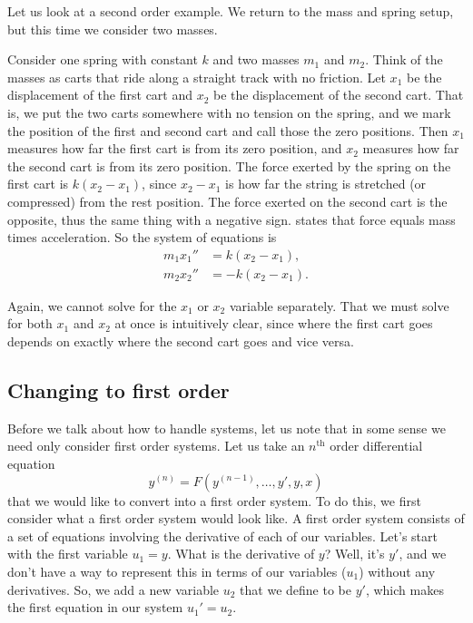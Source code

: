 \documentclass{ximera}
\begin{document}
\begin{example} \label{sintro:carts-example}
    Let us look at a second order example. We return to the mass and spring setup, but this time we consider two masses.
    
    \begin{mywrapfigsimp}{2.0in}{2.3in}
        \noindent
        
    \end{mywrapfigsimp}
    Consider one spring with constant $k$ and two masses $m_1$ and $m_2$.  Think of the masses as carts that ride along a straight track with no friction.  Let $x_1$ be the displacement of the first cart and $x_2$ be the displacement of the second cart. That is, we put the two carts somewhere with no tension on the spring, and we mark the position of the first and second cart and call those the zero positions. Then $x_1$ measures how far the first cart is from its zero position, and $x_2$ measures how far the second cart is from its zero position. The force exerted by the spring on the first cart is $k(x_2-x_1)$, since $x_2-x_1$ is how far the string is stretched (or compressed) from the rest position.  The force exerted on the second cart is the opposite, thus the same thing with a negative sign.  states that force equals mass times acceleration.  So the system of equations is
    \begin{align*}
        m_1 x_1'' & = k(x_2-x_1) , \\
        m_2 x_2'' & = - k(x_2-x_1) .
    \end{align*}
    
    Again, we cannot solve for the $x_1$ or $x_2$ variable separately. That we must solve for both $x_1$ and $x_2$ at once is intuitively clear, since where the first cart goes depends on exactly where the second cart goes and vice versa.
\end{example}

\subsection{Changing to first order}

Before we talk about how to handle systems, let us note that in some sense we need only consider first order systems. Let us take an $n^{\text{th}}$ order differential equation
\begin{equation*}
    y^{(n)} = F(y^{(n-1)},\ldots,y',y,x)
\end{equation*}
that we would like to convert into a first order system. To do this, we first consider what a first order system would look like. A first order system consists of a set of equations involving the derivative of each of our variables. Let's start with the first variable $u_1= y$. What is the derivative of $y$? Well, it's $y'$, and we don't have a way to represent this in terms of our variables ($u_1$) without any derivatives. So, we add a new variable $u_2$ that we define to be $y'$, which makes the first equation in our system $u_1' = u_2$. 
\end{document}
